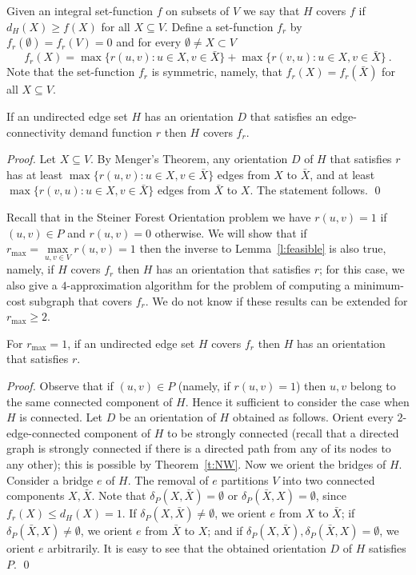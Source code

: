 \documentclass[envcountsame]{llncs}
\begin{document}
Given an integral set-function $f$ on subsets of $V$ we say that 
$H$ covers $f$ if $d_H(X) \geq f(X)$ for all $X \subseteq V$.
Define a set-function $f_r$ by $f_r(\emptyset)=f_r(V)=0$ and for every $\emptyset \neq X \subset V$
\begin{equation} \label{e:fr}
f_r(X)=\max \{r(u,v):u \in X, v \in \bar{X}\} + \max \{r(v,u):u \in X, v \in \bar{X}\} \ .
\end{equation}
Note that the set-function $f_r$ is symmetric, namely, that $f_r(X)=f_r(\bar{X})$ for all $X \subseteq V$.

\begin{lemma} \label{l:feasible}
If an undirected edge set $H$ has an orientation $D$ that satisfies an edge-connectivity demand function $r$ then $H$ covers $f_r$. 
\end{lemma}
\begin{proof}
Let $X \subseteq V$. By Menger's Theorem, any orientation $D$ of $H$ that satisfies $r$
has at least $\max \{r(u,v):u \in X, v \in \bar{X}\}$ edges from $X$ to $\bar{X}$,
and at least $\max \{r(v,u):u \in X, v \in \bar{X}\}$ edges from $\bar{X}$ to $X$.
The statement follows.
\qed
\end{proof}

Recall that in the {\sf Steiner Forest Orientation} problem 
we have $r(u,v)=1$ if $(u,v) \in P$ and $r(u,v)=0$ otherwise. 
We will show that if $r_{\max}=\max\limits_{u,v \in V}r(u,v)=1$
then the inverse to Lemma~\ref{l:feasible} is also true, namely,
if $H$ covers $f_r$ then $H$ has an orientation that satisfies $r$;
for this case, we also give a $4$-approximation algorithm for the problem of computing 
a minimum-cost subgraph that covers $f_r$.
We do not know if these results can be extended for $r_{\max} \geq 2$.

\begin{lemma} \label{l:1}
For $r_{\max}=1$, if an undirected edge set $H$ covers $f_r$ then $H$ has an orientation that satisfies $r$.
\end{lemma}
\begin{proof}
Observe that if $(u,v) \in P$ (namely, if $r(u,v)=1$) 
then $u,v$ belong to the same connected component of $H$.
Hence it sufficient to consider the case when $H$ is connected.
Let $D$ be an orientation of $H$ obtained as follows.
Orient every $2$-edge-connected component of $H$ to be strongly connected
(recall that a directed graph is strongly connected if there is a directed path from 
any of its nodes to any other); this is possible by Theorem~\ref{t:NW}.
Now we orient the bridges of $H$. 
Consider a bridge $e$ of $H$. 
The removal of $e$ partitions $V$ into two connected
components $X,\bar{X}$.
Note that $\delta_P(X,\bar{X})=\emptyset$ or 
$\delta_P(\bar{X},X)=\emptyset$, since $f_r(X) \leq d_H(X)=1$.
If $\delta_P(X,\bar{X}) \neq \emptyset$, we orient $e$ from $X$ to $\bar{X}$;
if $\delta_P(\bar{X},X) \neq \emptyset$, we orient $e$ from $\bar{X}$ to $X$;
and if $\delta_P(X,\bar{X}),\delta_P(\bar{X},X)=\emptyset$, we orient $e$ arbitrarily.
It is easy to see that the obtained orientation $D$ of $H$ satisfies $P$.
\qed
\end{proof}
\end{document}
